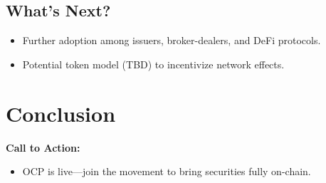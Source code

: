 \documentclass[11pt,a4paper]{article}
\begin{document}
\subsection{What’s Next?}
\begin{itemize}
    \item Further adoption among issuers, broker-dealers, and DeFi protocols.
    \item Potential token model (TBD) to incentivize network effects.
\end{itemize}

\section{Conclusion}
\textbf{Call to Action:}
\begin{itemize}
    \item OCP is live—join the movement to bring securities fully on-chain.
\end{itemize}
\end{document}
